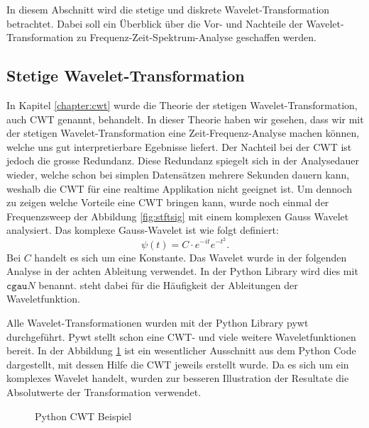 
In diesem Abschnitt wird die stetige und diskrete Wavelet-Transformation betrachtet. Dabei soll ein Überblick über die Vor- und Nachteile der Wavelet-Transformation zu Frequenz-Zeit-Spektrum-Analyse geschaffen werden. 



\subsection{Stetige Wavelet-Transformation} 
In Kapitel \ref{chapter:cwt} wurde die Theorie der stetigen Wavelet-Transformation, auch CWT genannt, behandelt. In dieser Theorie haben wir gesehen, dass wir mit der stetigen Wavelet-Transformation eine Zeit-Frequenz-Analyse machen können, welche uns gut interpretierbare Egebnisse liefert. Der Nachteil bei der CWT ist jedoch die grosse Redundanz. Diese Redundanz spiegelt sich in der Analysedauer wieder, welche schon bei simplen Datensätzen mehrere Sekunden dauern kann, weshalb die CWT für eine realtime Applikation nicht geeignet ist.
Um dennoch zu zeigen welche Vorteile eine CWT bringen kann, wurde noch einmal der Frequenzsweep der Abbildung \ref{fig:stftsig} mit einem komplexen Gauss Wavelet analysiert. Das komplexe Gauss-Wavelet ist wie folgt definiert:
\begin{equation}
\psi(t)=C \cdot e^{-it} e^{-t^{2}}
\label{eq:cgau}.
\end{equation}
Bei $C$ handelt es sich um eine Konstante. Das Wavelet wurde in der folgenden Analyse in der achten Ableitung verwendet. In der Python Library wird dies mit $\texttt{cgau}N$ benannt.  steht dabei für die Häufigkeit der Ableitungen der Waveletfunktion.

Alle Wavelet-Transformationen wurden mit der Python Library pywt \cite{Lee2019PyWavelets} durchgeführt. Pywt stellt schon eine CWT- und viele weitere Waveletfunktionen bereit. In der Abbildung \ref{fig:python-cwt} ist ein wesentlicher Ausschnitt aus dem Python Code dargestellt, mit dessen Hilfe die CWT jeweils erstellt wurde. Da es sich um ein komplexes Wavelet handelt, wurden zur besseren Illustration der Resultate die Absolutwerte der Transformation verwendet.

\begin{figure}
\centering

\caption{Python CWT Beispiel}
\label{fig:python-cwt}
\end{figure}

